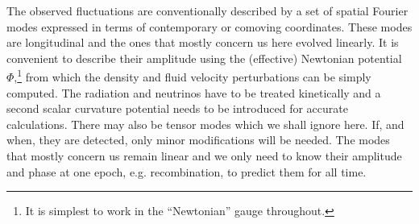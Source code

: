 \documentclass[psfig,11pt]{article}
\begin{document}
The observed fluctuations are conventionally described by a set of spatial Fourier modes expressed in terms of contemporary or comoving coordinates. These modes are longitudinal and the ones that mostly concern us here evolved linearly. It is convenient to describe their amplitude using the (effective) Newtonian potential $\Phi$,\footnote{It is simplest to work in the ``Newtonian'' gauge throughout.} from which the density and fluid velocity perturbations can be simply computed. The radiation and neutrinos have to be treated kinetically and a second scalar curvature potential needs to be introduced for accurate calculations. There may also be tensor modes which we shall ignore here. If, and when, they are detected, only minor modifications will be needed. The modes that mostly concern us remain linear and we only need to know their amplitude and phase at one epoch, e.g. recombination, to predict them for all time.
\end{document}
